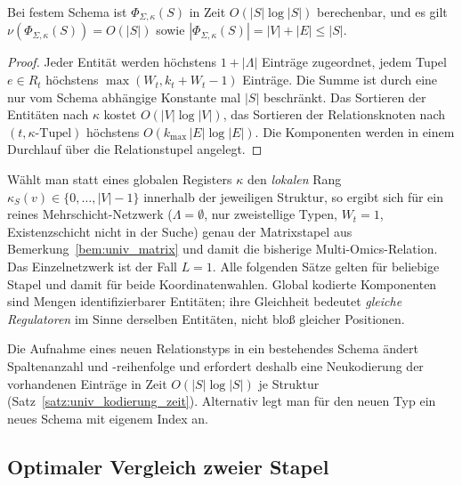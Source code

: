 \begin{satz}
	\label{satz:univ_kodierung_zeit}
	Bei festem Schema ist $\Phi_{\Sigma,\kappa}(S)$ in Zeit $O(|S|\log|S|)$ berechenbar, und es gilt $\nu(\Phi_{\Sigma,\kappa}(S))=O(|S|)$ sowie $|\Phi_{\Sigma,\kappa}(S)|=|V|+|E|\le|S|$.
\end{satz}

\begin{proof}
	Jeder Entität werden höchstens $1+|\Lambda|$ Einträge zugeordnet, jedem Tupel $e\in R_t$ höchstens $\max(W_t,k_t+W_t-1)$ Einträge. Die Summe ist durch eine nur vom Schema abhängige Konstante mal $|S|$ beschränkt. Das Sortieren der Entitäten nach $\kappa$ kostet $O(|V|\log|V|)$, das Sortieren der Relationsknoten nach $(t,\kappa\text{-Tupel})$ höchstens $O(k_{\max}\,|E|\log|E|)$. Die Komponenten werden in einem Durchlauf über die Relationstupel angelegt.
\end{proof}

\begin{bemerkung}
	\label{bem:univ_lokal}
	Wählt man statt eines globalen Registers $\kappa$ den \emph{lokalen} Rang $\kappa_S(v)\in\{0,\dots,|V|-1\}$ innerhalb der jeweiligen Struktur, so ergibt sich für ein reines Mehrschicht-Netzwerk ($\Lambda=\emptyset$, nur zweistellige Typen, $W_t=1$, Existenzschicht nicht in der Suche) genau der Matrixstapel aus Bemerkung~\ref{bem:univ_matrix} und damit die bisherige Multi-Omics-Relation. Das Einzelnetzwerk ist der Fall $L=1$. Alle folgenden Sätze gelten für beliebige Stapel und damit für beide Koordinatenwahlen. Global kodierte Komponenten sind Mengen identifizierbarer Entitäten; ihre Gleichheit bedeutet \emph{gleiche Regulatoren} im Sinne derselben Entitäten, nicht bloß gleicher Positionen.
\end{bemerkung}

\begin{bemerkung}[Schemaänderung]
	Die Aufnahme eines neuen Relationstyps in ein bestehendes Schema ändert Spaltenanzahl und -reihenfolge und erfordert deshalb eine Neukodierung der vorhandenen Einträge in Zeit $O(|S|\log|S|)$ je Struktur (Satz~\ref{satz:univ_kodierung_zeit}). Alternativ legt man für den neuen Typ ein neues Schema mit eigenem Index an.
\end{bemerkung}

\subsection{Optimaler Vergleich zweier Stapel}
\label{sec:univ_vergleich}

